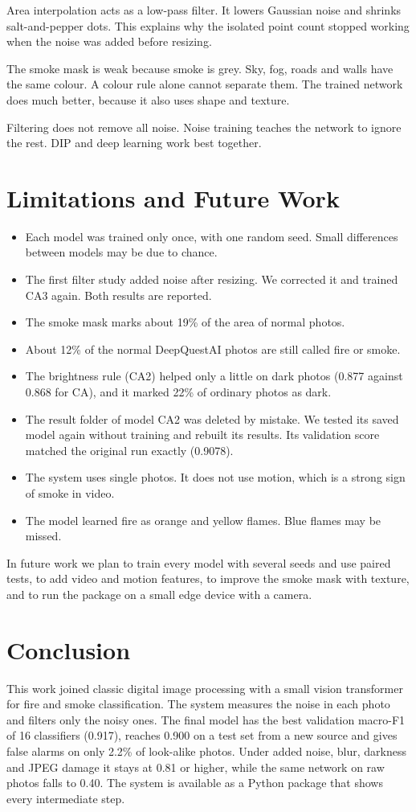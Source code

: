 \documentclass[10pt,twocolumn,letterpaper]{article}
\begin{document}
Area interpolation acts as a low-pass filter. It lowers Gaussian noise and shrinks salt-and-pepper dots. This explains why the isolated point count stopped working when the noise was added before resizing.

The smoke mask is weak because smoke is grey. Sky, fog, roads and walls have the same colour. A colour rule alone cannot separate them. The trained network does much better, because it also uses shape and texture.

Filtering does not remove all noise. Noise training teaches the network to ignore the rest. DIP and deep learning work best together.


\section{Limitations and Future Work}
\begin{itemize}
  \item Each model was trained only once, with one random seed. Small differences between models may be due to chance.
  \item The first filter study added noise after resizing. We corrected it and trained CA3 again. Both results are reported.
  \item The smoke mask marks about 19\% of the area of normal photos.
  \item About 12\% of the normal DeepQuestAI photos are still called fire or smoke.
  \item The brightness rule (CA2) helped only a little on dark photos (0.877 against 0.868 for CA), and it marked 22\% of ordinary photos as dark.
  \item The result folder of model CA2 was deleted by mistake. We tested its saved model again without training and rebuilt its results. Its validation score matched the original run exactly (0.9078).
  \item The system uses single photos. It does not use motion, which is a strong sign of smoke in video.
  \item The model learned fire as orange and yellow flames. Blue flames may be missed.
\end{itemize}

In future work we plan to train every model with several seeds and use paired tests, to add video and motion features, to improve the smoke mask with texture, and to run the package on a small edge device with a camera.


\section{Conclusion}
This work joined classic digital image processing with a small vision transformer for fire and smoke classification. The system measures the noise in each photo and filters only the noisy ones. The final model has the best validation macro-F1 of 16 classifiers (0.917), reaches 0.900 on a test set from a new source and gives false alarms on only 2.2\% of look-alike photos. Under added noise, blur, darkness and JPEG damage it stays at 0.81 or higher, while the same network on raw photos falls to 0.40. The system is available as a Python package that shows every intermediate step.
\end{document}
